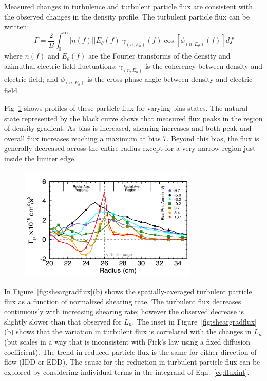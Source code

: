 \documentclass[aip,pop,amsmath,amssymb,preprint,superscriptaddress]{revtex4-1} %
\begin{document}
Measured changes in turbulence and turbulent particle flux are
consistent with the observed changes in the density profile.  The
turbulent particle flux can be written\cite{powers74}:
\begin{equation}
\Gamma = \frac{2}{B} \int^{\infty}_{0} \lvert n(f) \rvert \lvert E_{\theta}(f) \rvert \gamma_{(n,E_{\theta})}(f) \cos [\phi_{(n,E_{\theta})}(f)] df
\label{eq:fluxint}
\end{equation}
where $n(f)$ and $E_\theta(f)$ are the Fourier transforms of
the density and azimuthal electric field fluctuations;
$\gamma_{(n,E_\theta)}$ is the coherency between density and electric
field; and $\phi_{(n,E_\theta)}$ is the cross-phase angle between
density and electric field.

Fig~\ref{fig:particlefluxprofiles} shows profiles of these particle flux for varying bias states. The natural state represented by the black curve shows that measured flux peaks in the region of density gradient. As bias is increased, shearing increases and both peak and overall flux increases reaching a maximum at bias 7. Beyond this bias, the flux is generally decreased across the entire radius except for a very narrow region just inside the limiter edge.

\begin{figure}[!htbp]
\centerline{
\includegraphics[width=8.5cm]{particlefluxprofiles.png}}
\caption{\label{fig:particlefluxprofiles}}
\end{figure}

In Figure~\ref{fig:sheargradflux}(b) shows the spatially-averaged turbulent
particle flux as a function of normalized shearing rate.  The
turbulent flux decreases continuously with increasing shearing rate;
however the observed decrease is slightly slower than that observed
for $L_n$.  The inset in Figure~\ref{fig:sheargradflux}(b) shows that the variation in
turbulent flux is correlated with the changes in $L_n$ (but scales in a way
that is inconsistent with Fick's law using a fixed diffusion coefficient).  The
trend in reduced particle flux is the same for either direction of
flow (IDD or EDD).  The cause for the reduction in turbulent particle
flux can be explored by considering individual terms in the integrand
of Eqn.~\ref{eq:fluxint}.
\end{document}
